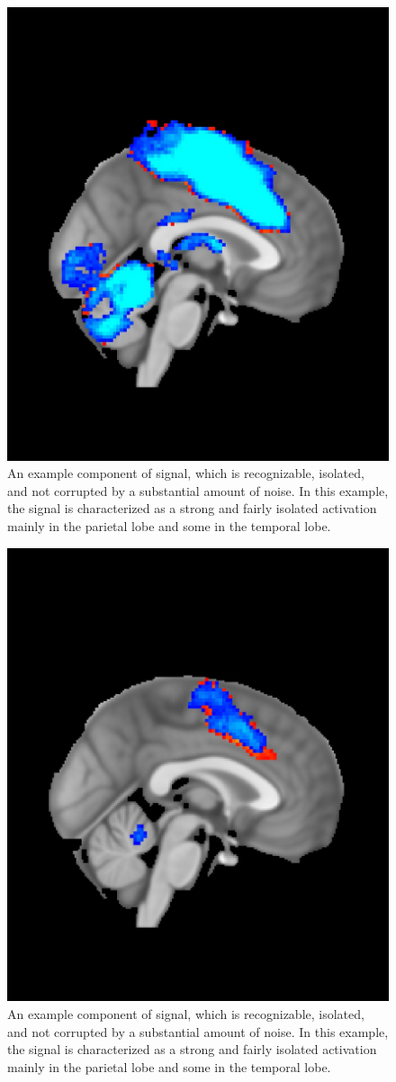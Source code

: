\begin{figure}[H]                 
	\includegraphics[width=.65\textwidth]{figures/Results/Pos_40-60}  
	\caption{An example component of signal, which is recognizable, isolated, and not corrupted by a substantial amount of noise. In this example, the signal is characterized as a strong and fairly isolated activation mainly in the parietal lobe and some in the temporal lobe.}
	\label{fig:res:diffneg} 
\end{figure}

\begin{figure}[H]                 
	\includegraphics[width=.65\textwidth]{figures/Results/Pos_80-100}  
	\caption{An example component of signal, which is recognizable, isolated, and not corrupted by a substantial amount of noise. In this example, the signal is characterized as a strong and fairly isolated activation mainly in the parietal lobe and some in the temporal lobe.}
	\label{fig:res:diffneg} 
\end{figure}